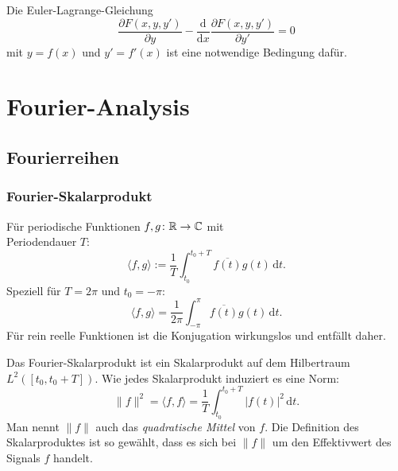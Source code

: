 Die Euler-Lagrange-Gleichung
\begin{equation}
\frac{\partial F(x,y,y')}{\partial y}
-\frac{\mathrm d}{\mathrm dx}\frac{\partial F(x,y,y')}{\partial y'}
=0
\end{equation}
mit $y=f(x)$ und $y'=f'(x)$ ist eine notwendige Bedingung dafür.

\clearpage
\section{Fourier-Analysis}
\subsection{Fourierreihen}
\subsubsection{Fourier-Skalarprodukt}%
\begin{definition}\mbox{}\newline
Für periodische Funktionen $f,g\colon\mathbb R\to\mathbb C$ mit\\
Periodendauer $T$:
\begin{equation}\label{eq:Fourier-Skalarprodukt}
\langle f,g\rangle := \frac{1}{T}\int_{t_0}^{t_0+T} \overline{f(t)}g(t)\,\mathrm dt.
\end{equation}
Speziell für $T=2\pi$ und $t_0=-\pi$:
\begin{equation}
\langle f,g\rangle = \frac{1}{2\pi}\int_{-\pi}^{\pi} \overline{f(t)}g(t)\,\mathrm dt.
\end{equation}
Für rein reelle Funktionen ist die Konjugation wirkungslos
und entfällt daher.
\end{definition}
Das Fourier-Skalarprodukt ist ein Skalarprodukt auf dem Hilbertraum
$L^2([t_0,t_0+T])$. Wie jedes Skalarprodukt induziert es eine Norm:%
\begin{equation}\label{eq:Fourier-Norm}
\|f\|^2 = \langle f,f\rangle
= \frac{1}{T}\int_{t_0}^{t_0+T} |f(t)|^2\,\mathrm dt.
\end{equation}
Man nennt $\|f\|$ auch das \emph{quadratische Mittel} von $f$.
Die Definition des Skalarproduktes ist so gewählt, dass es sich
bei $\|f\|$ um den Effektivwert des Signals $f$ handelt.

